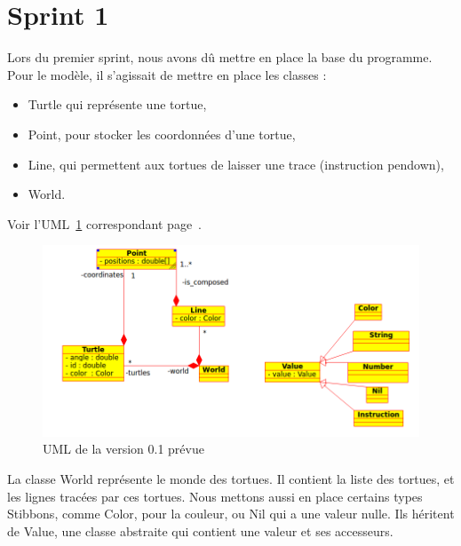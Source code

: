 \section{Sprint 1}
Lors du premier sprint, nous avons dû mettre en place la base du programme.\\ Pour le modèle, il s'agissait de mettre en place les classes :
\begin{itemize}
\item Turtle qui représente une tortue, 
\item Point, pour stocker les coordonnées d'une tortue,
\item Line, qui permettent aux tortues de laisser une trace (instruction pendown),
\item World.\\
\end{itemize}
Voir l'UML~\ref{v0.1} correspondant page~\pageref{v0.1}.\\
\begin{figure}[h]
\caption{\label{v0.1} UML de la version 0.1 prévue}
\includegraphics[scale=0.5]{doc/report/uml/v01.png}
\end{figure}
\newpage
La classe World représente le monde des tortues. Il contient la liste des tortues, et les lignes tracées par ces tortues.
Nous mettons aussi en place certains types Stibbons, comme Color, pour la couleur, ou Nil qui a une valeur nulle. Ils héritent de Value, une classe abstraite qui contient une valeur et ses accesseurs.\\


